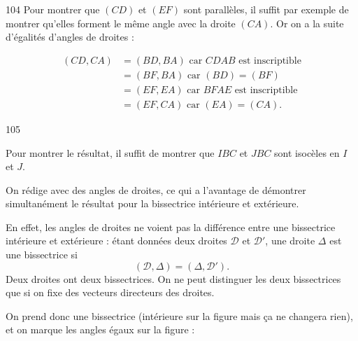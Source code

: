 \begin{Soln}{104}
Pour montrer que $(CD)$ et $(EF)$ sont parallèles, il suffit par exemple de montrer qu'elles forment le même angle avec la droite $(CA)$. Or on a la suite d'égalités d'angles de droites :

\begin{align*}
(CD,CA) &= (BD,BA) \text{ car $CDAB$ est inscriptible}\\
&= (BF,BA) \text{ car $(BD)=(BF)$}\\
&=(EF,EA) \text{ car $BFAE$ est inscriptible}\\
&=(EF,CA)  \text{ car $(EA)=(CA)$.}
\end{align*}

\end{Soln}
\begin{Soln}{105}

Pour montrer le résultat, il suffit de montrer que $IBC$ et $JBC$ sont isocèles en $I$ et $J$.

On rédige avec des angles de droites, ce qui a l'avantage de démontrer simultanément le résultat pour la bissectrice intérieure et extérieure.

En effet, les angles de droites ne voient pas la différence entre une bissectrice intérieure et extérieure : étant données deux droites $\mathcal D$ et $\mathcal D'$, une droite $\Delta$ est une bissectrice si
\[(\mathcal D,\Delta) = (\Delta,\mathcal D').\]
 Deux droites ont deux bissectrices. On ne peut distinguer les deux bissectrices que si on fixe des vecteurs directeurs des droites.

On prend donc une bissectrice (intérieure sur la figure mais ça ne changera rien), et on marque les angles égaux sur la figure :


\end{Soln}
